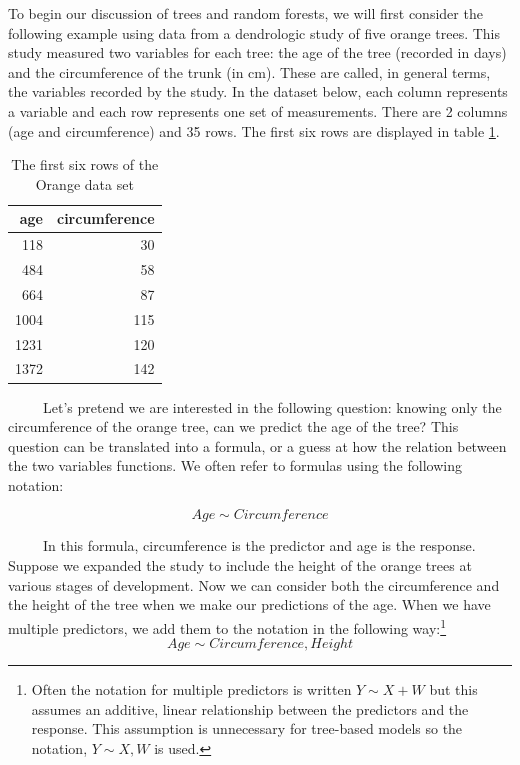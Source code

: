 \documentclass[12pt,twoside]{reedthesis}
\begin{document}
  To begin our discussion of trees and random forests, we will first
  consider the following example using data from a dendrologic study of
  five orange trees. This study measured two variables for each tree: the
  age of the tree (recorded in days) and the circumference of the trunk
  (in cm). These are called, in general terms, the variables recorded by
  the study. In the dataset below, each column represents a variable and
  each row represents one set of measurements. There are 2 columns (age
  and circumference) and 35 rows. The first six rows are displayed in
  table \ref{tab:taborange}.
  
  \begin{table}
  
  \caption{\label{tab:unnamed-chunk-2}\label{tab:taborange}The first six rows of the Orange data set}
  \centering
  \begin{tabular}[t]{r|r}
  \hline
  age & circumference\\
  \hline
  118 & 30\\
  \hline
  484 & 58\\
  \hline
  664 & 87\\
  \hline
  1004 & 115\\
  \hline
  1231 & 120\\
  \hline
  1372 & 142\\
  \hline
  \end{tabular}
  \end{table}
  
  ~~~~~Let's pretend we are interested in the following question: knowing
  only the circumference of the orange tree, can we predict the age of the
  tree? This question can be translated into a formula, or a guess at how
  the relation between the two variables functions. We often refer to
  formulas using the following notation:
  
  \[Age \sim Circumference \]
  
  ~~~~~In this formula, circumference is the predictor and age is the
  response. Suppose we expanded the study to include the height of the
  orange trees at various stages of development. Now we can consider both
  the circumference and the height of the tree when we make our
  predictions of the age. When we have multiple predictors, we add them to
  the notation in the following way:\footnote{Often the notation for
    multiple predictors is written \(Y \sim X+W\) but this assumes an
    additive, linear relationship between the predictors and the response.
    This assumption is unnecessary for tree-based models so the notation,
    \(Y\sim X,W\) is used.} \[Age \sim Circumference, Height\]
  
\end{document}
